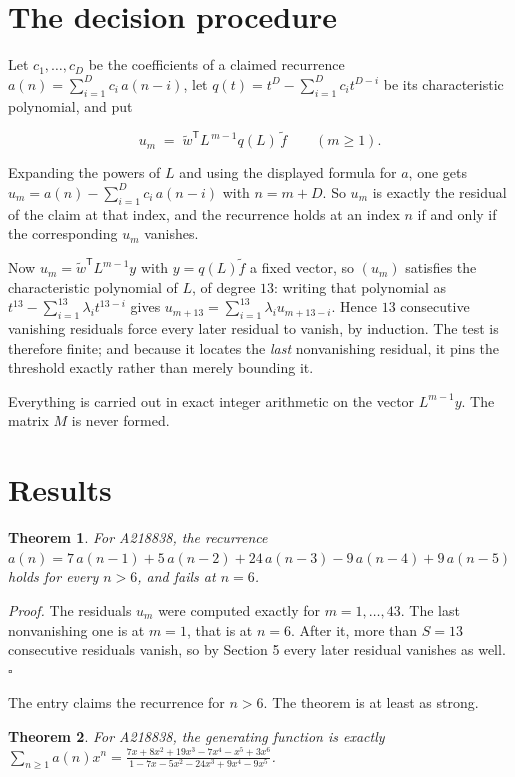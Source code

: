 \documentclass[11pt]{article}
\newtheorem{theorem}{Theorem}
\theoremstyle{definition}
\begin{document}
\section{The decision procedure}

Let $c_1,\dots,c_D$ be the coefficients of a claimed recurrence $a(n) = \sum_{i=1}^{D} c_i\,a(n-i)$, let $q(t) = t^{D} - \sum_{i=1}^{D} c_i t^{D-i}$ be its characteristic polynomial, and put

\[u_m \;=\; \tilde w^{\mathsf T} L^{\,m-1} q(L)\,\tilde f \qquad (m \ge 1).\]

Expanding the powers of $L$ and using the displayed formula for $a$, one gets $u_m = a(n) - \sum_{i=1}^{D} c_i\,a(n-i)$ with $n = m + D$. So $u_m$ is exactly the residual of the claim at that index, and the recurrence holds at an index $n$ if and only if the corresponding $u_m$ vanishes.

Now $u_m = \tilde w^{\mathsf T} L^{m-1} y$ with $y = q(L)\tilde f$ a fixed vector, so $(u_m)$ satisfies the characteristic polynomial of $L$, of degree $13$: writing that polynomial as $t^{13} - \sum_{i=1}^{13} \lambda_i t^{13-i}$ gives $u_{m+13} = \sum_{i=1}^{13} \lambda_i u_{m+13-i}$. Hence $13$ consecutive vanishing residuals force every later residual to vanish, by induction. The test is therefore finite; and because it locates the {\itshape last} nonvanishing residual, it pins the threshold exactly rather than merely bounding it.

Everything is carried out in exact integer arithmetic on the vector $L^{m-1}y$. The matrix $M$ is never formed.

\section{Results}

\begin{theorem} For A218838, the recurrence $a(n) = 7\,a(n-1) + 5\,a(n-2) + 24\,a(n-3) - 9\,a(n-4) + 9\,a(n-5)$ holds for every $n > 6$, and fails at $n = 6$.\end{theorem}

{\itshape Proof.} The residuals $u_m$ were computed exactly for $m = 1,\dots,43$. The last nonvanishing one is at $m = 1$, that is at $n = 6$. After it, more than $S = 13$ consecutive residuals vanish, so by Section 5 every later residual vanishes as well. $\square$

The entry claims the recurrence for $n > 6$. The theorem is at least as strong.

\begin{theorem} For A218838, the generating function is exactly $\sum_{n\ge 1} a(n)x^n = \frac{7x + 8x^{2} + 19x^{3} - 7x^{4} - x^{5} + 3x^{6}}{1 - 7x - 5x^{2} - 24x^{3} + 9x^{4} - 9x^{5}}$.\end{theorem}
\end{document}
